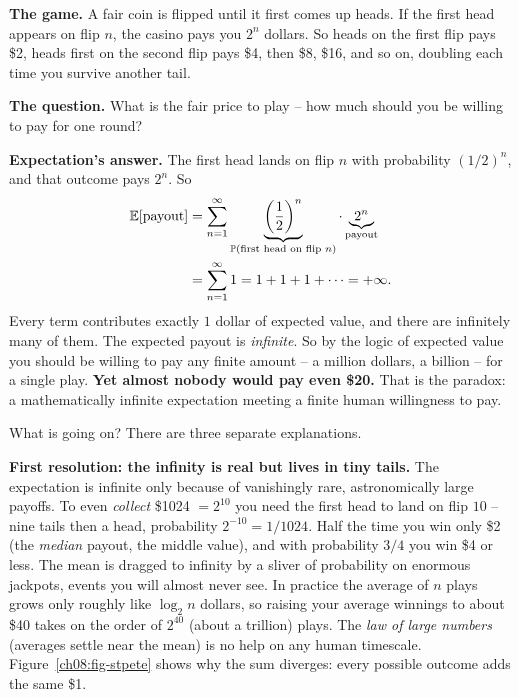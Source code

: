 \begin{paradoxbox}
\textbf{The game.} A fair coin is flipped until it first comes up heads. If the
first head appears on flip $n$, the casino pays you $2^n$ dollars. So heads on the
first flip pays \$2, heads first on the second flip pays \$4, then \$8, \$16, and
so on, doubling each time you survive another tail.

\textbf{The question.} What is the fair price to play -- how much should you be
willing to pay for one round?

\textbf{Expectation's answer.} The first head lands on flip $n$ with probability
$(1/2)^n$, and that outcome pays $2^n$. So
\begin{align*}
  \operatorname{\mathbb{E}}[\text{payout}]
    &= \sum_{n=1}^{\infty} \underbrace{\left(\frac12\right)^{n}}_{\operatorname{\mathbb{P}}(\text{first head on flip } n)}
       \cdot \underbrace{2^{n}}_{\text{payout}}\\
    &= \sum_{n=1}^{\infty} 1 = 1 + 1 + 1 + \cdots = +\infty.
\end{align*}
Every term contributes exactly $1$ dollar of expected value, and there are
infinitely many of them. The expected payout is \emph{infinite}. So by the
logic of expected value you should be willing to pay any finite amount -- a
million dollars, a billion -- for a single play. \textbf{Yet almost nobody
would pay even \$20.} That is the paradox: a mathematically infinite expectation
meeting a finite human willingness to pay.
\end{paradoxbox}

What is going on? There are three separate explanations.

\begin{happeningbox}
\textbf{First resolution: the infinity is real but lives in tiny tails.} The
expectation is infinite only because of vanishingly rare, astronomically large
payoffs. To even \emph{collect} \$1024 $= 2^{10}$ you need the first head to land
on flip $10$ -- nine tails then a head, probability $2^{-10} = 1/1024$. Half
the time you win only \$2 (the \emph{median} payout, the middle value), and with
probability $3/4$ you win \$4 or less. The mean is dragged to infinity by a
sliver of probability on enormous jackpots, events you will almost never see.
In practice the average of $n$ plays grows only roughly like $\log_2 n$ dollars,
so raising your average winnings to about \$40 takes on the order of $2^{40}$
(about a trillion) plays. The \emph{law of large numbers} (averages settle
near the mean) is no help on any human timescale.
Figure~\ref{ch08:fig-stpete} shows why the sum diverges: every possible
outcome adds the same \$1.
\end{happeningbox}

